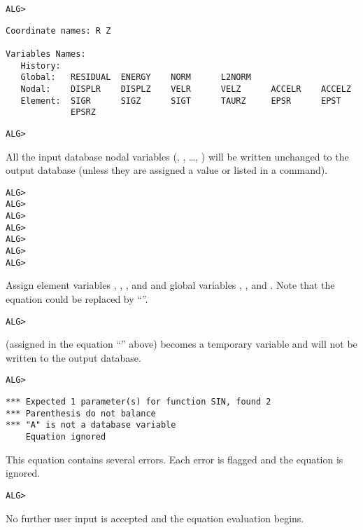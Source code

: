 \verb|ALG>| 
\begin{verbatim}
Coordinate names: R Z

Variables Names:
   History:
   Global:   RESIDUAL  ENERGY    NORM      L2NORM
   Nodal:    DISPLR    DISPLZ    VELR      VELZ      ACCELR    ACCELZ
   Element:  SIGR      SIGZ      SIGT      TAURZ     EPSR      EPST
             EPSRZ
\end{verbatim}

\verb|ALG>| 

\begin{comments}
All the input database nodal variables (, , \ldots,
) will be written unchanged to the output database (unless
they are assigned a value or listed in a  command).
\end{comments}

\newpage
\verb|ALG>|
 \\
\verb|ALG>|
 \\
\verb|ALG>|
 \\
\verb|ALG>|
 \\
\verb|ALG>|
 \\
\verb|ALG>|
 \\
\verb|ALG>|

\begin{comments}
Assign element variables , , , and
 and global variables , , and
. Note that the  equation could be replaced by
``''.
\end{comments}

\verb|ALG>| 

\begin{comments}
 (assigned in the equation ``'' above)
becomes a temporary variable and will not be written to the output
database.
\end{comments}

\verb|ALG>| 
\vspace{-\medskipamount} 
\begin{verbatim}
*** Expected 1 parameter(s) for function SIN, found 2
*** Parenthesis do not balance
*** "A" is not a database variable
    Equation ignored
\end{verbatim}

\begin{comments}
This equation contains several errors. Each error is flagged and the
equation is ignored.
\end{comments}

\verb|ALG>| 

\begin{comments}
No further user input is accepted and the equation evaluation
begins.
\end{comments}
